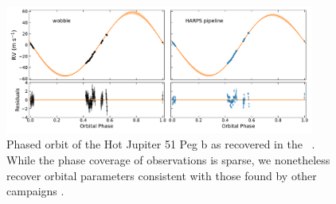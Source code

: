 \documentclass[modern]{aastex62}
\begin{document}
{\begin{figure}
\centering
\includegraphics[width=4in]{51peg_planet}
\caption{Phased orbit of the Hot Jupiter 51 Peg b as recovered in the \wobble\ \RVs. While the phase coverage of \HARPS observations is sparse, we nonetheless recover orbital parameters consistent with those found by other \RV campaigns .  }
\label{fig:51peg_planet}
\end{figure}

}
\end{document}
